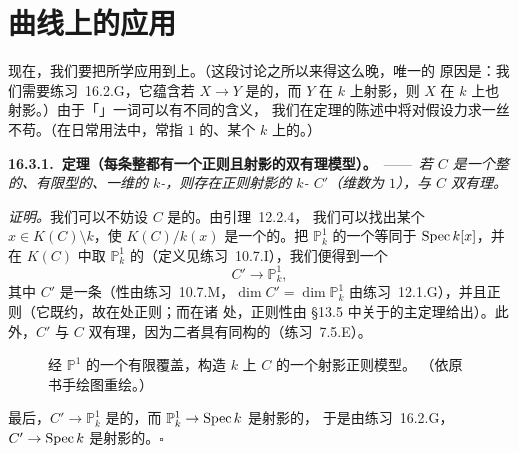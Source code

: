 
\section{曲线上的应用}

现在，我们要把所学应用到\trCurve{}上。（这段讨论之所以来得这么晚，唯一的
原因是：我们需要\mbox{练习~16.2.G}，它蕴含若 $X\to Y$ 是\trFinite{}的，而 $Y$
在 $k$ 上射影，则 $X$ 在 $k$ 上也射影。）由于「\trCurve」一词可以有不同的含义，
我们在定理的陈述中将对假设力求一丝不苟。（在日常用法中，\trCurve{}常指%
\trPureDimension{} $1$ 的、某个\trField{} $k$ 上的\trVariety。）

\textbf{16.3.1.\ 定理（每条整\trCurve{}都有一个正则且射影的双有理模型）。}\ ——\
\emph{若 $C$ 是一个整的、有限型的、一维的 $k$-\trScheme，则存在正则射影的
$k$-\trVariety{} $C'$（维数为 $1$），与 $C$ 双有理。}

\emph{证明。}\quad 我们可以不妨设 $C$ 是\trAffine{}的。由\mbox{\trNoetherNormalization{}引理~12.2.4}，
我们可以找出某个 $x\in K(C)\setminus k$，使 $K(C)/k(x)$ 是一个\trFinite{}的\trFieldExtension。把
$\mathbb{P}^1_k$ 的一个\trStandardOpenSet{}等同于 $\operatorname{Spec} k[x]$，并在\trFunctionField{} $K(C)$
中取 $\mathbb{P}^1_k$ 的\trNormalization（定义见\mbox{练习~10.7.I}），我们便得到一个\trFinite\trMorphism
\[
C'\longrightarrow\mathbb{P}^1_k,
\]
其中 $C'$ 是一条\trCurve（\trFinite{}性由\mbox{练习~10.7.M}，$\dim C'=\dim\mathbb{P}^1_k$
由\mbox{练习~12.1.G}），并且正则（它既约，故在\trGenericPoint{}处正则；而在诸%
\trClosedPoint{}处，正则性由 \S13.5 中关于\trDVR{}的主定理给出）。此外，$C'$ 与 $C$
双有理，因为二者具有同构的\trFunctionField（\mbox{练习~7.5.E}）。

\begin{figure}[htbp]
\centering
{}
\caption{经 $\mathbb{P}^1$ 的一个有限覆盖，构造 $k$ 上\trCurve{} $C$ 的一个射影正则模型。
（依原书手绘图重绘。）}%
\label{fig:curve-proj-regular-model}
\end{figure}

最后，$C'\to\mathbb{P}^1_k$ 是\trFinite{}的，而 $\mathbb{P}^1_k\to\operatorname{Spec} k$ 是射影的，
于是由\mbox{练习~16.2.G}，$C'\to\operatorname{Spec} k$ 是射影的。\hfill$\square$


